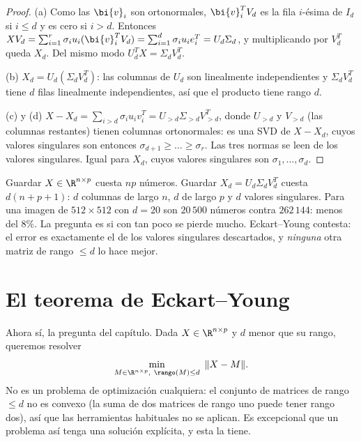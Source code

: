 \begin{proof}
(a) Como las $\bi{v}_i$ son ortonormales, $\bi{v}_i^T V_d$ es la fila $i$-ésima de
$I_d$ si $i\le d$ y es cero si $i>d$. Entonces
$XV_d=\sum_{i=1}^r\sigma_iu_i(\bi{v}_i^T V_d)=\sum_{i=1}^d\sigma_iu_ie_i^T
=U_d\Sigma_d$, y multiplicando por $V_d^T$ queda $X_d$. Del mismo modo
$U_d^T X=\Sigma_dV_d^T$.

(b) $X_d=U_d(\Sigma_dV_d^T)$: las columnas de $U_d$ son linealmente
independientes y $\Sigma_dV_d^T$ tiene $d$ filas linealmente
independientes, así que el producto tiene rango $d$.

(c) y (d) $X-X_d=\sum_{i>d}\sigma_iu_iv_i^T=U_{>d}\Sigma_{>d}V_{>d}^T$,
donde $U_{>d}$ y $V_{>d}$ (las columnas restantes) tienen columnas
ortonormales: es una SVD de $X-X_d$, cuyos valores singulares son entonces
$\sigma_{d+1}\ge\dots\ge\sigma_r$. Las tres normas se leen de los valores
singulares. Igual para $X_d$, cuyos valores singulares son
$\sigma_1,\dots,\sigma_d$.
\end{proof}

\begin{remark}\label{pca-rem:compresion}
Guardar $X\in\R^{n\times p}$ cuesta $np$ números. Guardar $X_d=U_d\Sigma_dV_d^T$
cuesta $d(n+p+1)$: $d$ columnas de largo $n$, $d$ de largo $p$ y $d$ valores
singulares. Para una imagen de $512\times512$ con $d=20$ son $20\,500$
números contra $262\,144$: menos del $8\%$. La pregunta es si con tan poco se
pierde mucho. Eckart--Young contesta: el error es exactamente el de los
valores singulares descartados, y \emph{ninguna} otra matriz de rango $\le d$
lo hace mejor.
\end{remark}

\section{El teorema de Eckart--Young}\label{pca-sec:EY}

Ahora sí, la pregunta del capítulo. Dada $X\in\R^{n\times p}$ y $d$ menor que
su rango, queremos resolver
\begin{equation}\label{pca-eq:EYprob}
\min_{M\in\R^{n\times p},\ \rango(M)\le d}\ \|X-M\| .
\end{equation}
No es un problema de optimización cualquiera: el conjunto de matrices de rango
$\le d$ no es convexo (la suma de dos matrices de rango uno puede tener rango
dos), así que las herramientas habituales no se aplican. Es excepcional que un
problema así tenga una solución explícita, y esta la tiene.


